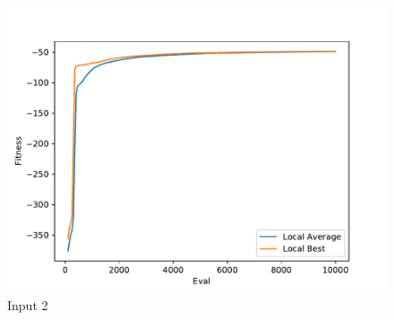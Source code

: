 \documentclass{standalone}
\begin{document}
\begin{figure}[!htb]
	\caption{Input 2}
	\label{fig:graph_2042}
	\includegraphics[width=\textwidth]{../graphs/graphs/2042.pdf}
\end{figure}
\end{document}
